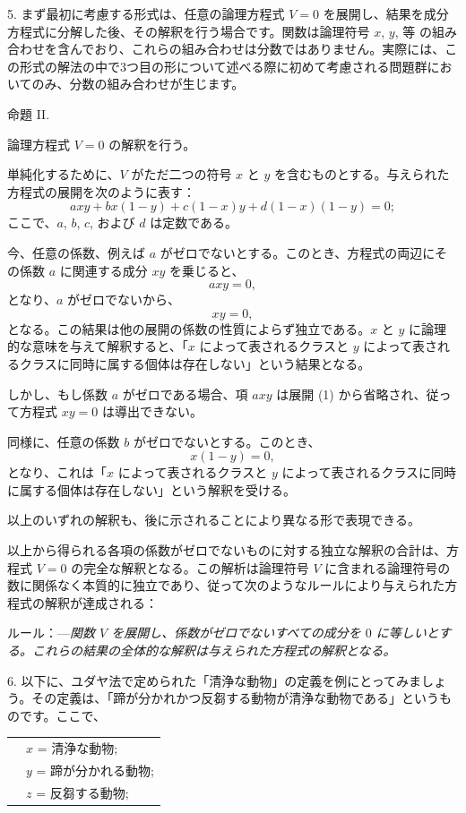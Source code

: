 \documentclass[a4paper,11pt,openany]{ltjsbook}
\begin{document}
5. まず最初に考慮する形式は、任意の論理方程式 $V=0$ を展開し、結果を成分方程式に分解した後、その解釈を行う場合です。関数は論理符号 $x$, $y$, 等 の組み合わせを含んでおり、これらの組み合わせは分数ではありません。実際には、この形式の解法の中で3つ目の形について述べる際に初めて考慮される問題群においてのみ、分数の組み合わせが生じます。

\begin{center}
\textsc{命題 II.}
\end{center}

論理方程式 $V = 0$ の解釈を行う。

単純化するために、$V$ がただ二つの符号 $x$ と $y$ を含むものとする。与えられた方程式の展開を次のように表す：
\[
axy + bx(1-y) + c(1-x)y + d(1-x)(1-y) = 0;
\]
ここで、$a$, $b$, $c$, および $d$ は定数である。

今、任意の係数、例えば $a$ がゼロでないとする。このとき、方程式の両辺にその係数 $a$ に関連する成分 $xy$ を乗じると、
\[
axy = 0,
\]
となり、$a$ がゼロでないから、
\[
xy = 0,
\]
となる。この結果は他の展開の係数の性質によらず独立である。$x$ と $y$ に論理的な意味を与えて解釈すると、「$x$ によって表されるクラスと $y$ によって表されるクラスに同時に属する個体は存在しない」という結果となる。

しかし、もし係数 $a$ がゼロである場合、項 $axy$ は展開 (1) から省略され、従って方程式 $xy = 0$ は導出できない。

同様に、任意の係数 $b$ がゼロでないとする。このとき、
\[
x(1-y) = 0,
\]
となり、これは「$x$ によって表されるクラスと $y$ によって表されるクラスに同時に属する個体は存在しない」という解釈を受ける。

以上のいずれの解釈も、後に示されることにより異なる形で表現できる。

以上から得られる各項の係数がゼロでないものに対する独立な解釈の合計は、方程式 $V = 0$ の完全な解釈となる。この解析は論理符号 $V$ に含まれる論理符号の数に関係なく本質的に独立であり、従って次のようなルールにより与えられた方程式の解釈が達成される：

\textsc{ルール}：---\textit{関数 $V$ を展開し、係数がゼロでないすべての成分を $0$ に等しいとする。これらの結果の全体的な解釈は与えられた方程式の解釈となる。}

6. 以下に、ユダヤ法で定められた「清浄な動物」の定義を例にとってみましょう。その定義は、「蹄が分かれかつ反芻する動物が清浄な動物である」というものです。ここで、

\begin{tabular}{c l}
&$x$ = 清浄な動物;\\
&$y$ = 蹄が分かれる動物;\\
&$z$ = 反芻する動物;
\end{tabular}
\end{document}
